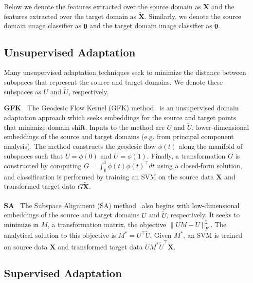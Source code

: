 Below we denote the features extracted over the source domain as $\bm{X}$ and the features extracted over the target domain as $\tilde{\bm{X}}$. Similarly, we denote the source domain image classifier as $\bm{\theta}$ and the target domain image classifier as $\bm{\tilde{\theta}}$.

\subsection{Unsupervised Adaptation}
Many unsupervised adaptation techniques seek to minimize the distance between subspaces that represent the source and target domains. We denote these subspaces as $U$ and $\tilde{U}$, respectively.

{\bf GFK~\cite{gong-cvpr12}}
The Geodesic Flow Kernel (GFK) method~\cite{gong-cvpr12} is an unsupervised domain adaptation approach which seeks embeddings for the source and target points that minimize domain shift.
Inputs to the method are $U$ and $\tilde{U}$, lower-dimensional embeddings of the source and target domains (e.g. from principal component analysis).
The method constructs the geodesic flow $\phi(t)$ along the manifold of subspaces such that $U = \phi(0)$ and $\tilde{U} = \phi(1)$.
Finally, a transformation $G$ is constructed by computing
$
G =
\int_0^1 \phi(t) \phi(t)^{\intercal} dt
$
using a closed-form solution, and classification is performed by training an SVM on the source data $\bm{X}$ and transformed target data $G\tilde{\bm{X}}$.
\\\\
{\bf SA~\cite{sa}}
The Subspace Alignment (SA) method~\cite{sa} also begins with low-dimensional embeddings of the source and target domains $U$ and $\tilde{U}$, respectively.
It seeks to minimize in $M$, a transformation matrix, the objective
$ \| UM - \tilde{U} \|^2_F$.
The analytical solution to this objective is $M^* = U^{\intercal} \tilde{U}$.
Given $M^*$, an SVM is trained on source data $\bm{X}$ and transformed target data $U M^* \tilde{U}^{\intercal} \tilde{\bm{X}}$.


\subsection{Supervised Adaptation}

